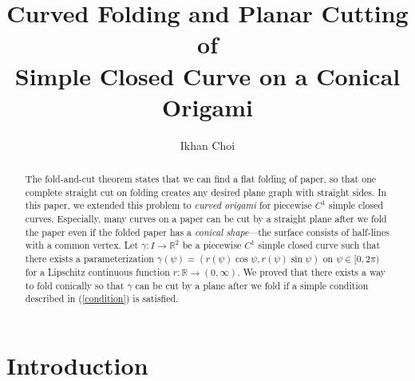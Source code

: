 \documentclass{amsart}
\theoremstyle{plain}
\theoremstyle{definition}
\theoremstyle{remark}
\begin{document}
\title[Fold-and-Cut of Simple Closed Curve under Conical Origami]
{Curved Folding and Planar Cutting of \\ Simple Closed Curve on a Conical Origami}

\author[I. Choi]{Ikhan Choi}
\address{Seoul Science High School, Seoul 110-530, Republic of Korea}





\begin{abstract}
The fold-and-cut theorem states that we can find a flat folding of paper, so that one complete straight cut on folding creates any desired plane graph with straight sides.
In this paper, we extended this problem to \emph{curved origami} for piecewise $C^1$ simple closed curves.
Especially, many curves on a paper can be cut by a straight plane after we fold the paper even if the folded paper has a \emph{conical shape}---the surface consists of half-lines with a common vertex.
Let $\gamma:I\to\mathbb{R}^2$ be a piecewise $C^1$ simple closed curve such that there exists a parameterization $\gamma(\psi)=(r(\psi)\cos\psi,r(\psi)\sin\psi)$ on $\psi\in[0,2\pi)$ for a Lipschitz continuous function $r:\mathbb{R}\to(0,\infty)$.
We proved that there exists a way to fold conically so that $\gamma$ can be cut by a plane after we fold if a simple condition described in (\ref{condition}) is satisfied.
\end{abstract}



\maketitle

\section{Introduction}%
\end{document}
